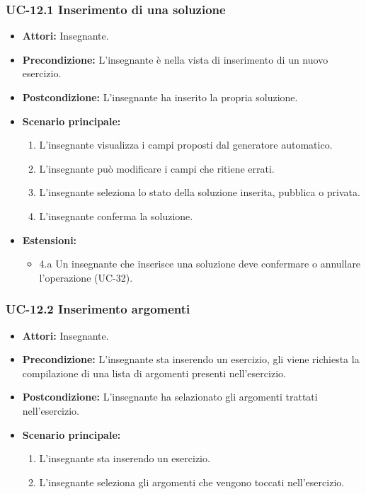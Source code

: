 \subsubsection{UC-12.1 Inserimento di una soluzione}
\begin{itemize}
\item \textbf{Attori: }Insegnante.
\item \textbf{Precondizione: }L'insegnante è nella vista di inserimento di un nuovo esercizio.
\item \textbf{Postcondizione: }L'insegnante ha inserito la propria soluzione.
\item \textbf{Scenario principale: }
		\begin{enumerate} 
		\item L'insegnante visualizza i campi proposti dal generatore automatico. 
		\item L'insegnante può modificare i campi che ritiene errati.
		\item L'insegnante seleziona lo stato della soluzione inserita, pubblica o privata.
		\item L'insegnante conferma la soluzione.
		\end{enumerate}	
	\item \textbf{Estensioni:}
	\begin{itemize}
	\item 4.a Un insegnante che inserisce una soluzione deve confermare o annullare l'operazione (UC-32).
	\end{itemize}
\end{itemize}

\subsubsection{UC-12.2 Inserimento argomenti}
\begin{itemize}
\item \textbf{Attori: }Insegnante.

\item \textbf{Precondizione:} L'insegnante sta inserendo un esercizio, gli viene richiesta la compilazione di una lista di argomenti presenti nell'esercizio.
\item \textbf{Postcondizione:} L'insegnante ha selazionato gli argomenti trattati nell'esercizio.
\item \textbf{Scenario principale: }
		\begin{enumerate}
		\item L'insegnante sta inserendo un esercizio. 
		\item L'insegnante seleziona gli argomenti che vengono toccati nell'esercizio. 
		\end{enumerate}
\end{itemize}				

